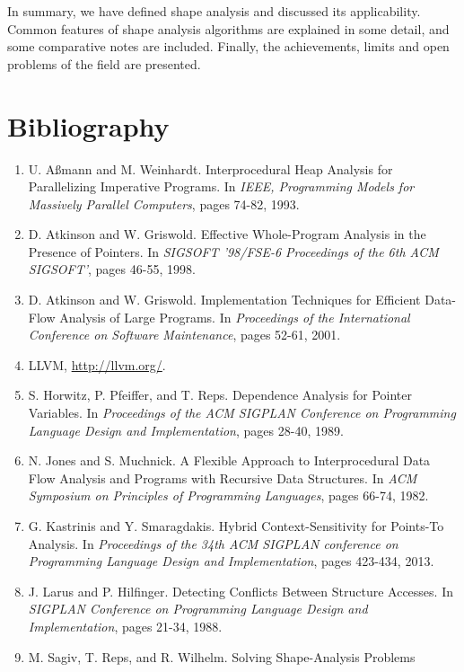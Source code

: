 \documentclass{article}
\begin{document}
In summary, we have defined shape analysis and discussed its applicability.
Common features of shape analysis algorithms are explained in some detail,
and some comparative notes are included. Finally, the achievements, limits
and open problems of the field are presented.

\section{Bibliography}

\begin{enumerate}[1.]
    \item U. A{\ss}mann and M. Weinhardt. Interprocedural Heap Analysis for
        Parallelizing Imperative Programs. In \textit{IEEE, Programming
        Models for Massively Parallel Computers}, pages 74-82, 1993.
    \item D. Atkinson and W. Griswold. Effective Whole-Program Analysis in
        the Presence of Pointers. In \textit{SIGSOFT '98/FSE-6 Proceedings
        of the 6th ACM SIGSOFT'}, pages 46-55, 1998.
    \item D. Atkinson and W. Griswold. Implementation Techniques for
        Efficient Data-Flow Analysis of Large Programs. In
        \textit{Proceedings of the International Conference on Software
        Maintenance}, pages 52-61, 2001.
    \item LLVM, \url{http://llvm.org/}.
    \item S. Horwitz, P. Pfeiffer, and T. Reps. Dependence Analysis for
        Pointer Variables. In \textit{Proceedings of the ACM SIGPLAN 
        Conference on Programming Language Design and Implementation}, pages
        28-40, 1989.
    \item N. Jones and S. Muchnick. A Flexible Approach to Interprocedural
        Data Flow Analysis and Programs with Recursive Data Structures. In
        \textit{ACM Symposium on Principles of Programming Languages}, pages
        66-74, 1982.
    \item G. Kastrinis and Y. Smaragdakis. Hybrid Context-Sensitivity for
        Points-To Analysis. In \textit{Proceedings of the 34th ACM SIGPLAN
        conference on Programming Language Design and Implementation}, pages
        423-434, 2013.
    \item J. Larus and P. Hilfinger. Detecting Conflicts Between Structure
        Accesses. In \textit{SIGPLAN Conference on Programming Language
        Design and Implementation}, pages 21-34, 1988.
    \item M. Sagiv, T. Reps, and R. Wilhelm. Solving Shape-Analysis Problems

\end{enumerate}
\end{document}
